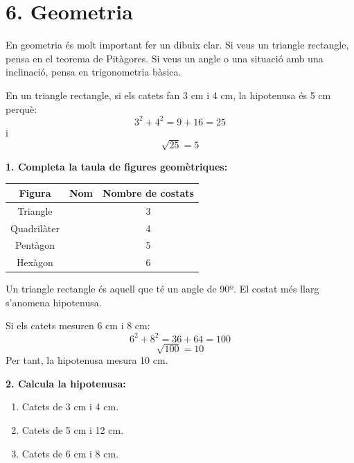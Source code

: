 \documentclass[12pt,a4paper]{article}
\begin{document}
\newpage

\section*{6. Geometria}

\begin{capsula}
En geometria és molt important fer un dibuix clar. Si veus un triangle rectangle, pensa en el teorema de Pitàgores. Si veus un angle o una situació amb una inclinació, pensa en trigonometria bàsica.
\end{capsula}

\begin{exemple}
En un triangle rectangle, si els catets fan 3 cm i 4 cm, la hipotenusa és 5 cm perquè:
\[
3^2+4^2=9+16=25
\]
i
\[
\sqrt{25}=5
\]
\end{exemple}

\textbf{1. Completa la taula de figures geomètriques:}

\begin{center}
\begin{tabular}{|c|c|c|}
\hline
\rowcolor{cyan!20}
\textbf{Figura} & \textbf{Nom} & \textbf{Nombre de costats} \\ \hline
Triangle &  & 3 \\ \hline
Quadrilàter &  & 4 \\ \hline
Pentàgon &  & 5 \\ \hline
Hexàgon &  & 6 \\ \hline
\end{tabular}
\end{center}

\begin{capsula}
Un triangle rectangle és aquell que té un angle de 90º. El costat més llarg s'anomena hipotenusa.
\end{capsula}

\begin{exemple}
Si els catets mesuren 6 cm i 8 cm:
\[
6^2+8^2=36+64=100
\]
\[
\sqrt{100}=10
\]
Per tant, la hipotenusa mesura 10 cm.
\end{exemple}

\textbf{2. Calcula la hipotenusa:}
\begin{enumerate}[label=\alph*)]
    \item Catets de 3 cm i 4 cm. \vspace{1cm}
    \item Catets de 5 cm i 12 cm. \vspace{1cm}
    \item Catets de 6 cm i 8 cm. \vspace{1cm}
\end{enumerate}
\end{document}
